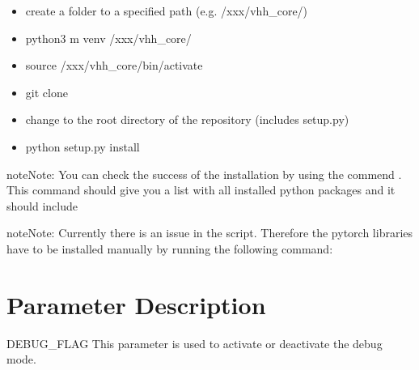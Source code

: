 \documentclass[letterpaper,10pt,english,openany,oneside]{sphinxmanual}
\begin{document}
\begin{itemize}
\item {} 
create a folder to a specified path (e.g. /xxx/vhh\_core/)

\item {} 
python3 \sphinxhyphen{}m venv /xxx/vhh\_core/

\end{itemize}

\begin{itemize}
\item {} 
source /xxx/vhh\_core/bin/activate

\end{itemize}

\begin{itemize}
\item {} 
git clone 

\end{itemize}

\begin{itemize}
\item {} 
change to the root directory of the repository (includes setup.py)

\item {} 
python setup.py install

\end{itemize}

\begin{sphinxadmonition}{note}{Note:}
You can check the success of the installation by using the commend . This command should give you a list with all installed python packages and it should include 
\end{sphinxadmonition}

\begin{sphinxadmonition}{note}{Note:}
Currently there is an issue in the  script. Therefore the pytorch libraries have to be installed manually by running the following command:
\end{sphinxadmonition}


\chapter{Parameter Description}
\label{\detokenize{index:parameter-description}}
DEBUG\_FLAG
This parameter is used to activate or deactivate the debug mode.
\end{document}

